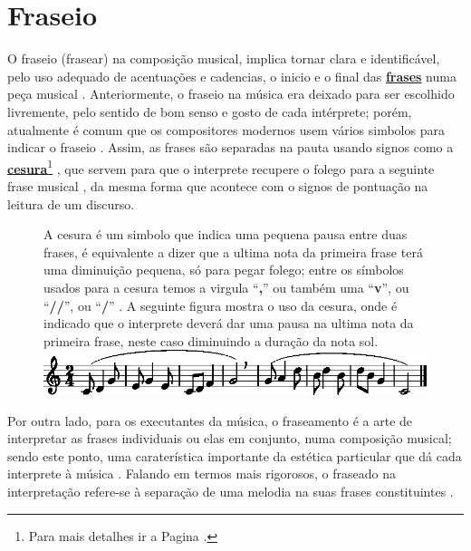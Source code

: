 \section{Fraseio}
\label{sec:fraseio}

O fraseio (frasear) na composição musical, implica  tornar clara e identificável, 
pelo uso adequado de acentuações e cadencias, 
o inicio e o final das \hyperref[sec:Frase]{\textbf{frases}} numa peça musical \cite[pp. 336]{medteoria} \cite[pp. 19]{holst1998abc}.
Anteriormente, 
o fraseio na música era deixado para ser escolhido livremente, pelo sentido de bom senso e gosto de cada intérprete;
porém, atualmente é comum que os compositores modernos usem vários simbolos para indicar o fraseio \cite[pp. 348]{stainer2009dictionary}.
Assim, as frases são separadas na pauta usando signos como a \hyperref[fig:Cesura]{\textbf{cesura}}\footnote{Para
 mais detalhes ir a Pagina \pageref{fig:Cesura}.}  \cite[pp. 668]{apel1969harvard},
que servem para que o interprete recupere o folego 
para  a seguinte frase musical \cite[pp. 18]{holst1998abc} \cite[pp. 48]{howard1991aprendendo},
da mesma forma que acontece com o signos de pontuação na leitura de um discurso.




\begin{figure}[!h]
\begin{elaboracion}[title=Cesura]
A cesura é um simbolo que indica uma pequena pausa entre duas frases,
é equivalente a dizer que a ultima nota da primeira frase terá uma diminuição pequena, só para pegar folego;
entre os símbolos usados para a cesura temos a virgula ``\textbf{,}'' 
ou também uma ``\textbf{v}'', ou ``\textbf{//}'', ou ``\textbf{/}'' 
\cite[pp. 252]{medteoria} \cite[pp. 18]{holst1998abc}.
A seguinte figura mostra o uso da cesura, onde é indicado que o interprete deverá 
dar uma pausa na ultima nota da primeira frase, neste caso diminuindo a duração da nota sol.\\
\includegraphics[width=\textwidth]{chapters/cap-musica-topicos/cesura1-1.eps}
\end{elaboracion}
\label{fig:Cesura}
\end{figure}
 
Por outra lado, para os executantes da música, 
o fraseamento é a arte de interpretar as frases individuais ou elas em conjunto, numa composição musical;
sendo este ponto, 
uma caraterística importante da estética particular que dá cada interprete à música 
\cite[pp. 257]{medteoria} \cite[pp. 624]{latham2008diccionario}.
Falando em termos mais rigorosos, 
o fraseado na interpretação refere-se à separação de uma melodia na suas frases constituintes 
\cite[pp. 668]{apel1969harvard}.

